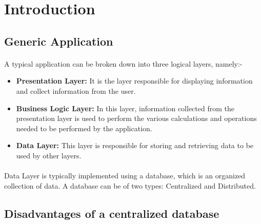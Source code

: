 \documentclass{article}
\begin{document}
\clearpage

\tableofcontents
\clearpage

\section{Introduction}
    \subsection{Generic Application}
        \paragraph{} A typical application can be broken down into three logical layers, namely:-
        \begin{itemize}
            \item \textbf{Presentation Layer: }It is the layer responsible for displaying information and collect information from the user.
            \item \textbf{Business Logic Layer: }In this layer, information collected from the presentation layer is used to perform the various calculations and operations needed to be performed by the application.
            \item \textbf{Data Layer: }This layer is responsible for storing and retrieving data to be used by other layers.
        \end{itemize}

        \paragraph{}Data Layer is typically implemented using a database, which is an organized collection of data. A database can be of two types: Centralized and Distributed.
        
    \subsection{Disadvantages of a centralized database}
\end{document}
